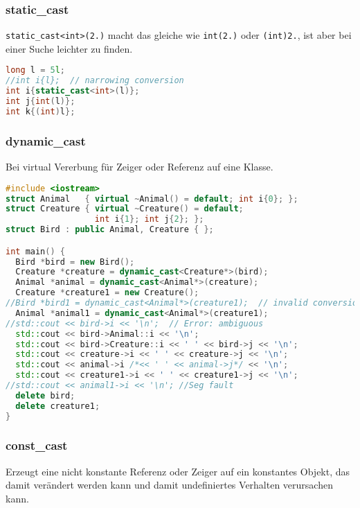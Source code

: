 \documentclass[10pt,twocolumn]{scrartcl}
\begin{document}
\subsubsection{static\_cast}

\lstinline|static_cast<int>(2.)| macht das gleiche wie \lstinline|int(2.)| oder
\lstinline|(int)2.|, ist aber bei einer Suche leichter zu finden.

\begin{lstlisting}[language=C++]
long l = 5l;
//int i{l};  // narrowing conversion
int i{static_cast<int>(l)};
int j{int(l)};
int k{(int)l};
\end{lstlisting}

\subsubsection{dynamic\_cast}

Bei virtual Vererbung für Zeiger oder Referenz auf eine Klasse.

\begin{lstlisting}[language=C++]
#include <iostream>
struct Animal   { virtual ~Animal() = default; int i{0}; };
struct Creature { virtual ~Creature() = default;
                  int i{1}; int j{2}; };
struct Bird : public Animal, Creature { };

int main() {
  Bird *bird = new Bird();
  Creature *creature = dynamic_cast<Creature*>(bird);
  Animal *animal = dynamic_cast<Animal*>(creature);
  Creature *creature1 = new Creature();
//Bird *bird1 = dynamic_cast<Animal*>(creature1);  // invalid conversion
  Animal *animal1 = dynamic_cast<Animal*>(creature1);
//std::cout << bird->i << '\n';  // Error: ambiguous
  std::cout << bird->Animal::i << '\n';
  std::cout << bird->Creature::i << ' ' << bird->j << '\n';
  std::cout << creature->i << ' ' << creature->j << '\n';
  std::cout << animal->i /*<< ' ' << animal->j*/ << '\n';
  std::cout << creature1->i << ' ' << creature1->j << '\n';
//std::cout << animal1->i << '\n'; //Seg fault
  delete bird;
  delete creature1;
}
\end{lstlisting}

\subsubsection{const\_cast}

Erzeugt eine nicht konstante Referenz oder Zeiger auf ein konstantes Objekt, das
damit verändert werden kann und damit undefiniertes Verhalten verursachen kann.
\end{document}
